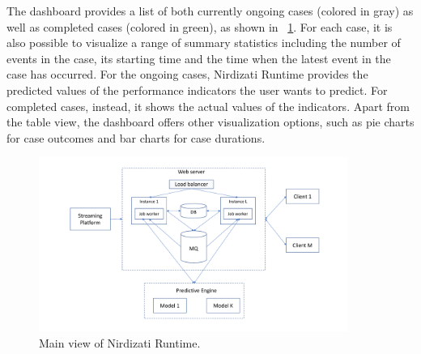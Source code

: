 \documentclass[runningheads,a4paper]{llncs}
\begin{document}
The dashboard provides a list of both currently ongoing cases (colored in gray) as well as completed cases (colored in green), as shown in \figurename~\ref{fig:nirdizati-runtime}. For each case, it is also possible to visualize a range of summary statistics including the number of events in the case, its starting time and the time when the latest event in the case has occurred. For the ongoing cases, Nirdizati Runtime provides the predicted values of the performance indicators the user wants to predict. For completed cases, instead, it shows the actual values of the indicators. Apart from the table view, the dashboard offers other visualization options, such as pie charts for case outcomes and bar charts for case durations.





\begin{figure}
	\centering
	\includegraphics[width=0.9\textwidth]{img/nirdizati-runtime}
	\caption{Main view of Nirdizati Runtime.}
	\label{fig:nirdizati-runtime}
	\vspace{-0.5\baselineskip}
\end{figure}
\end{document}
